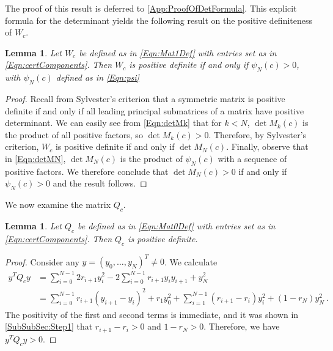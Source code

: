 \documentclass[11pt]{article}
\numberwithin{equation}{section}
\newtheorem{lemma}[thm]{Lemma}
\theoremstyle{definition}
\theoremstyle{definition}
\theoremstyle{definition}
\newcommand{\1}{\mathbf{1}}
\begin{document}
The proof of this result is deferred to \cref{App:ProofOfDetFormula}. This explicit formula for the determinant yields the following result on the positive definiteness of $W_c$.
\begin{lemma}\label{Lem:Mat1PD}
    Let $W_c$ be defined as in \eqref{Eqn:Mat1Def} with entries set as in \eqref{Eqn:certComponents}. Then $W_c$ is positive definite if and only if $\psi_N(c) > 0$, with $\psi_N(c)$ defined as in \eqref{Eqn:psi}
\end{lemma}
\begin{proof}
    Recall from Sylvester's criterion that a symmetric matrix is positive definite if and only if all leading principal submatrices of a matrix have positive determinant. We can easily see from \eqref{Eqn:detMk} that for $k<N$, $\det M_k(c)$ is the product of all positive factors, so $\det M_k(c) > 0$. Therefore, by Sylvester's criterion, $W_c$ is positive definite if and only if $\det M_N(c)$. Finally, observe that in \eqref{Eqn:detMN}, $\det M_N(c)$ is the product of $\psi_N(c)$ with a sequence of positive factors. We therefore conclude that $\det M_N(c) > 0$ if and only if $\psi_N(c) > 0$ and the result follows.
\end{proof}

We now examine the matrix $Q_c$.
\begin{lemma}\label{Lem:Mat0PD}
    Let $Q_c$ be defined as in \eqref{Eqn:Mat0Def} with entries set as in \eqref{Eqn:certComponents}. Then $Q_c$ is positive definite.
\end{lemma}
\begin{proof}
    Consider any $y = (y_0,\dots,y_N)^T \neq 0$. We calculate
    \begin{align*}
        y^T Q_c y &= \sum_{i=0}^{N-1} 2 r_{i+1} y_i^2 - 2\sum_{i=0}^{N-1} r_{i+1} y_i y_{i+1} + y_N^2 \\
        & = \sum_{i=0}^{N-1} r_{i+1}(y_{i+1}-y_i)^2 + r_1 y_0^2 + \sum_{i=1}^{N-1} (r_{i+1}-r_i)y_i^2 + (1-r_N)y_N^2 \ .
    \end{align*}
    The positivity of the first and second terms is immediate, and it was shown in \cref{SubSubSec:Step1} that $r_{i+1}-r_i > 0$ and $1-r_N > 0$. Therefore, we have $y^T Q_c y>0$.
\end{proof}
\end{document}
